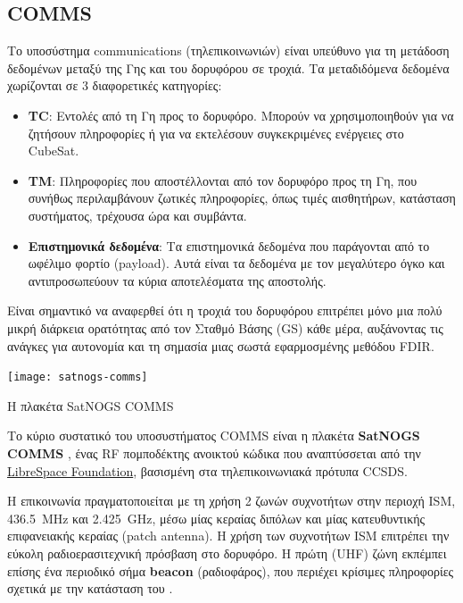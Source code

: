 \documentclass[a4paper,nobib]{tufte-book}
\begin{document}

\subsection{\acf{COMMS}}

Το υποσύστημα communications (τηλεπικοινωνιών) είναι υπεύθυνο για τη μετάδοση δεδομένων μεταξύ της Γης και του δορυφόρου σε τροχιά. Τα μεταδιδόμενα δεδομένα χωρίζονται σε 3 διαφορετικές κατηγορίες\autocite{DDJF_TTC}:
\begin{itemize}
	\item \textbf{\acf{TC}}: Εντολές από τη Γη προς το δορυφόρο. Μπορούν να χρησιμοποιηθούν για να ζητήσουν πληροφορίες ή για να εκτελέσουν συγκεκριμένες ενέργειες στο CubeSat.
	\item \textbf{\acf{TM}}: Πληροφορίες που αποστέλλονται από τον δορυφόρο προς τη Γη, που συνήθως περιλαμβάνουν ζωτικές πληροφορίες, όπως τιμές αισθητήρων, κατάσταση συστήματος, τρέχουσα ώρα και συμβάντα.
	\item \textbf{Επιστημονικά δεδομένα}: Τα επιστημονικά δεδομένα που παράγονται από το ωφέλιμο φορτίο (payload). Αυτά είναι τα δεδομένα με τον μεγαλύτερο όγκο και αντιπροσωπεύουν τα κύρια  αποτελέσματα της αποστολής.
\end{itemize}

Είναι σημαντικό να αναφερθεί ότι η τροχιά του δορυφόρου επιτρέπει μόνο μια πολύ μικρή διάρκεια ορατότητας από τον Σταθμό Βάσης (\acl{GS}) κάθε μέρα, αυξάνοντας τις ανάγκες για αυτονομία και τη σημασία μιας σωστά εφαρμοσμένης μεθόδου \acs{FDIR}.

\begin{marginfigure}
	\texttt{[image: satnogs-comms]}
	\caption{Η πλακέτα SatNOGS COMMS}
\end{marginfigure}

Το κύριο συστατικό του υποσυστήματος \acs{COMMS} είναι η πλακέτα \textbf{SatNOGS COMMS} \autocite{surligas_satnogscomms_2021}, ένας \acs{RF} πομποδέκτης ανοικτού κώδικα που αναπτύσσεται από την \href{https://libre.space/}{LibreSpace Foundation}, βασισμένη στα τηλεπικοινωνιακά πρότυπα \acs{CCSDS}.

Η επικοινωνία πραγματοποιείται με τη χρήση 2 ζωνών συχνοτήτων στην περιοχή \acs{ISM}, \SI{436.5}{\mega\hertz} και \SI{2.425}{\giga\hertz}, μέσω μίας κεραίας διπόλων και μίας κατευθυντικής επιφανειακής κεραίας (patch antenna). Η χρήση των συχνοτήτων \acs{ISM} επιτρέπει την εύκολη ραδιοερασιτεχνική πρόσβαση στο δορυφόρο. Η πρώτη (\acs{UHF}) ζώνη εκπέμπει επίσης ένα περιοδικό σήμα \textbf{beacon} (ραδιοφάρος), που περιέχει κρίσιμες πληροφορίες σχετικά με την κατάσταση του .
\end{document}
